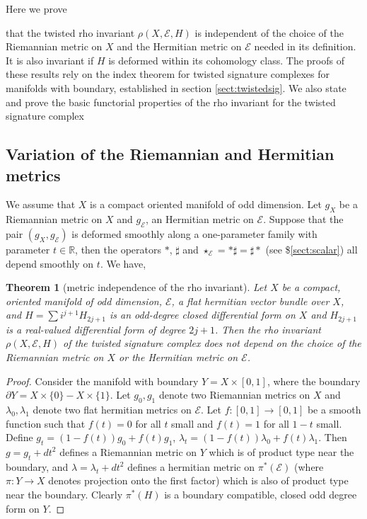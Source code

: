 \documentclass[12pt]{amsart}
\theoremstyle{plain}
\newtheorem{theorem}{Theorem}[section]
\theoremstyle{definition}
\theoremstyle{remark}
\begin{document}
Here we prove {{that } the twisted rho invariant $\rho(X,{\mathcal E},H)$ is independent of the
choice of the Riemannian metric on $X$ and the Hermitian metric on ${\mathcal E}$ needed
in its definition. It is also invariant if $H$ is deformed within its cohomology class.
The proofs of these results rely on the index theorem for twisted signature 
complexes for manifolds with boundary, established in section \ref{sect:twistedsig}.
We also state and prove the basic functorial properties of the rho invariant
 for the twisted signature complex

\subsection{Variation of the Riemannian and Hermitian metrics}
We assume that $X$ is a compact oriented manifold of odd dimension.
Let $g_X$ be a Riemannian metric on $X$ and $g_{\mathcal E}$, an Hermitian metric 
on ${\mathcal E}$.
Suppose that the pair $(g_X,g_{\mathcal E})$ is deformed smoothly along a one-parameter
family with parameter $t\in{\mathbb{R}}$, then the operators $\ast$, $\sharp$ and 
$\star_{\mathcal E}=\ast\sharp=\sharp\ast$ (see \$\ref{sect:scalar}) all depend smoothly
on $t$.
We have,

\begin{theorem}[metric independence of the rho invariant]\label{thm:indept}
Let $X$ be a compact, oriented manifold of odd dimension, ${\mathcal E}$, a flat hermitian vector
bundle over $X$, and $H = \sum i^{j+1} H_{2j+1} $ is an 
odd-degree closed differential form on $X$ and $H_{2j+1}$ is a real-valued differential form 
of degree ${2j+1}$. 
Then the rho invariant $\rho(X,{\mathcal E},H)$ of the twisted signature complex
does not depend on the choice of the Riemannian metric on $X$ or the
Hermitian metric on ${\mathcal E}$. 
\end{theorem} 

\begin{proof}
Consider the manifold with boundary $Y = X \times [0, 1]$, where the boundary $\partial Y 
= X \times \{0\} - X \times \{1\}$. Let $g_0, g_1$ denote two Riemannian metrics on $X$ and 
$\lambda_0, \lambda_1$ denote two flat hermitian metrics on ${\mathcal E}$. Let $f: [0, 1] \to  [0, 1]$
be a smooth function such that $f (t)= 0$ for all $t$ small and $f (t)= 1$ for all $1-t$ small.
Define $g_t = (1-f(t))g_0 + f(t) g_1$, $\lambda_t =  (1-f(t))\lambda_0 + f(t) \lambda_1$. Then 
$g = g_t + dt^2$ defines a Riemannian metric on $Y$ which is of product type near the boundary,
and $\lambda = \lambda_t + dt^2$ defines a hermitian metric on $\pi^*({\mathcal E})$ (where $\pi : Y \to X$
denotes projection onto the first factor) which is also of product type near the boundary. Clearly 
$\pi^*(H)$ is a boundary compatible, closed odd degree form on $Y$.


\end{proof}}
\end{document}
